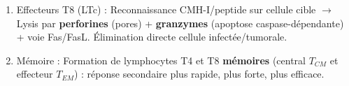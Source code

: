 \documentclass[11pt]{article}
\newcommand{\cle}[1]{{\popxbold\color{popdark}#1}}
\begin{document}
\begin{methode}
\begin{enumerate}
\begin{itemize}
\item \textbf{Th17} (IL-6, TGF-$\beta$, IL-23) : IL-17 $\rightarrow$ recrutement neutrophiles, barrières muqueuses (champignons, bactéries extracellulaires).
\item \textbf{Tfh} (Folliculaires) : Aide spécialisée aux lymphocytes B dans les centres germinatifs (affinité, commutation, mémoire).
\item \textbf{Treg} (Régulateurs, FoxP3$^{+}$) : Tolérance, frein réponse immune (IL-10, TGF-$\beta$).
\end{itemize}
\item \cle{Effecteurs T8 (LTc)} : Reconnaissance CMH-I/peptide sur cellule cible $\rightarrow$ Lysis par \textbf{perforines} (pores) + \textbf{granzymes} (apoptose caspase-dépendante) + voie Fas/FasL. Élimination directe cellule infectée/tumorale.
\item \cle{Mémoire} : Formation de lymphocytes T4 et T8 \textbf{mémoires} (central $T_{CM}$ et effecteur $T_{EM}$) : réponse secondaire plus rapide, plus forte, plus efficace.
\end{enumerate}
\end{methode}
\end{document}
